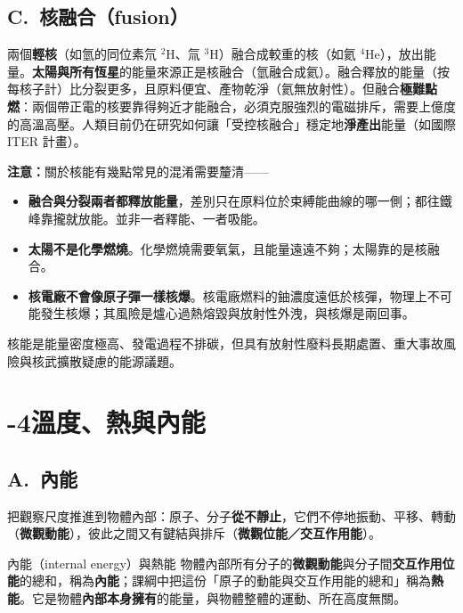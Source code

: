 \documentclass[11pt]{article}
\begin{document}
\subsection*{\sffamily C.\ 核融合（fusion）}

兩個\textbf{輕核}（如氫的同位素氘 $^2$H、氚 $^3$H）融合成較重的核（如氦 $^4$He），放出能量。\textbf{太陽與所有恆星}的能量來源正是核融合（氫融合成氦）。融合釋放的能量（按每核子計）比分裂更多，且原料便宜、產物乾淨（氦無放射性）。但融合\textbf{極難點燃}：兩個帶正電的核要靠得夠近才能融合，必須克服強烈的電磁排斥，需要上億度的高溫高壓。人類目前仍在研究如何讓「受控核融合」穩定地\textbf{淨產出}能量（如國際 ITER 計畫）。

\textbf{注意：}關於核能有幾點常見的混淆需要釐清——

\begin{itemize}\setlength{\itemsep}{1pt}
\item \textbf{融合與分裂兩者都釋放能量}，差別只在原料位於束縛能曲線的哪一側；都往鐵峰靠攏就放能。並非一者釋能、一者吸能。
\item \textbf{太陽不是化學燃燒}。化學燃燒需要氧氣，且能量遠遠不夠；太陽靠的是核融合。
\item \textbf{核電廠不會像原子彈一樣核爆}。核電廠燃料的鈾濃度遠低於核彈，物理上不可能發生核爆；其風險是爐心過熱熔毀與放射性外洩，與核爆是兩回事。
\end{itemize}

核能是能量密度極高、發電過程不排碳，但具有放射性廢料長期處置、重大事故風險與核武擴散疑慮的能源議題。

\section*{-4\quad 溫度、熱與內能}

\subsection*{\sffamily A.\ 內能}

把觀察尺度推進到物體內部：原子、分子\textbf{從不靜止}，它們不停地振動、平移、轉動（\textbf{微觀動能}），彼此之間又有鍵結與排斥（\textbf{微觀位能／交互作用能}）。

\begin{補充框}{內能（internal energy）與熱能}
物體內部所有分子的\textbf{微觀動能}與分子間\textbf{交互作用位能}的總和，稱為\textbf{內能}；課綱中把這份「原子的動能與交互作用能的總和」稱為\textbf{熱能}。它是物體\textbf{內部本身擁有}的能量，與物體整體的運動、所在高度無關。
\end{補充框}
\end{document}
